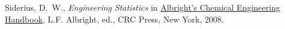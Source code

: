 Siderius, D.~W., {\it Engineering Statistics} in \underline{Albright's Chemical Engineering Handbook}, L.F. Albright, ed., CRC Press, New York, 2008.
